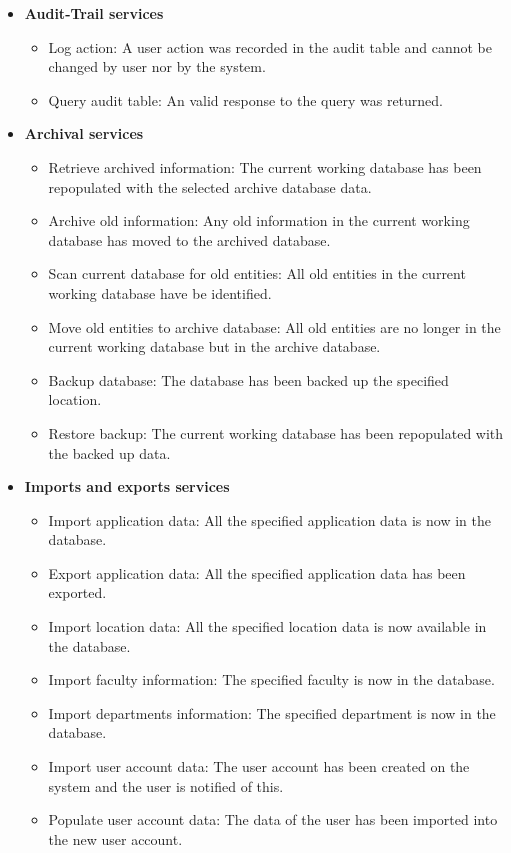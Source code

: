 \documentclass[12pt]{article}
\begin{document}
\begin{itemize}
	\item \textbf{Audit-Trail services}
		\begin{itemize}
			\item Log action: A user action was recorded in the audit table and cannot be changed by user nor by the system.
			\item Query audit table: An valid response to the query was returned.									
		\end{itemize}
	\item \textbf{Archival services}
		\begin{itemize}
			\item Retrieve archived information: The current working database has been repopulated with the selected archive database data.
			\item Archive old information: Any old information in the current working database has moved to the archived database.
			\item Scan current database for old entities: All old entities in the current working database have be identified.
			\item Move old entities to archive database: All old entities are no longer in the current working database but in the archive database.
			\item Backup database: The database has been backed up the specified location.	
			\item Restore backup: The current working database has been repopulated with the backed up data.								
		\end{itemize}
	\item \textbf{Imports and exports services}
		\begin{itemize}
			\item Import application data: All the specified application data is now in the database.
			\item Export application data: All the specified application data has been exported.	
			\item Import location data: All the specified location data is now available in the database. 
			\item Import faculty information: The specified faculty is now in the database.
			\item Import departments information: The specified department is now in the database.
			\item Import user account data: The user account has been created on the system and the user is notified of this.
			\item Populate user account data: The data of the user has been imported into the new user account.

\end{itemize}
\end{itemize}
\end{document}
